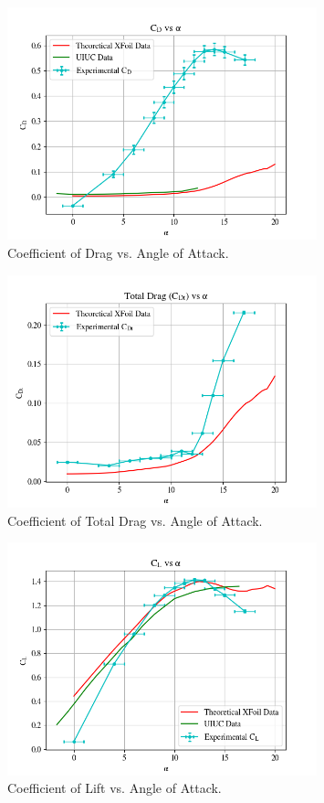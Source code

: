 \documentclass[11pt, letterpaper]{article}
\begin{document}
\begin{appendices}
\begin{figure}[!hpt]
        \centering        
        \includegraphics[width=0.8\textwidth]{Figures/C_d-a.png}
        \caption{Coefficient of Drag vs. Angle of Attack.}
        \label{fig:C_d-a}
\end{figure}

\begin{figure}[!hpt]
        \centering        
        \includegraphics[width=0.8\textwidth]{Figures/C_Dt-a.png}
        \caption{Coefficient of Total Drag vs. Angle of Attack.}
        \label{fig:C_Dt-a}
\end{figure}

\begin{figure}[!hpt]
        \centering        
        \includegraphics[width=0.8\textwidth]{Figures/C_l-a.png}
        \caption{Coefficient of Lift vs. Angle of Attack.}
        \label{fig:C_p-a17}
\end{figure}


\end{appendices}
\end{document}
